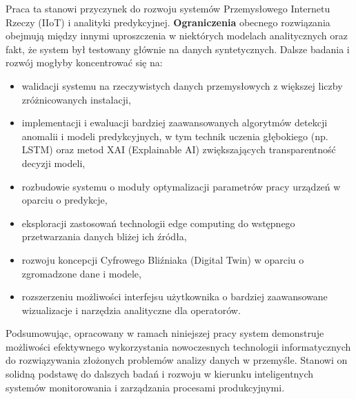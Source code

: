 Praca ta stanowi przyczynek do rozwoju systemów Przemysłowego Internetu Rzeczy (IIoT) i analityki predykcyjnej. \textbf{Ograniczenia} obecnego rozwiązania obejmują między innymi uproszczenia w niektórych modelach analitycznych oraz fakt, że system był testowany głównie na danych syntetycznych. Dalsze badania i rozwój mogłyby koncentrować się na:
\begin{itemize}
    \item walidacji systemu na rzeczywistych danych przemysłowych z większej liczby zróżnicowanych instalacji,
    \item implementacji i ewaluacji bardziej zaawansowanych algorytmów detekcji anomalii i modeli predykcyjnych, w tym technik uczenia głębokiego (np. LSTM) oraz metod XAI (Explainable AI) zwiększających transparentność decyzji modeli,
    \item rozbudowie systemu o moduły optymalizacji parametrów pracy urządzeń w oparciu o predykcje,
    \item eksploracji zastosowań technologii edge computing do wstępnego przetwarzania danych bliżej ich źródła,
    \item rozwoju koncepcji Cyfrowego Bliźniaka (Digital Twin) w oparciu o zgromadzone dane i modele,
    \item rozszerzeniu możliwości interfejsu użytkownika o bardziej zaawansowane wizualizacje i narzędzia analityczne dla operatorów.
\end{itemize}

Podsumowując, opracowany w ramach niniejszej pracy system demonstruje możliwości efektywnego wykorzystania nowoczesnych technologii informatycznych do rozwiązywania złożonych problemów analizy danych w przemyśle. Stanowi on solidną podstawę do dalszych badań i rozwoju w kierunku inteligentnych systemów monitorowania i zarządzania procesami produkcyjnymi. 